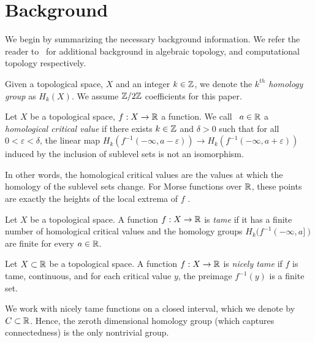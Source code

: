 \section{Background}\label{sec:background}

We begin by summarizing the necessary background information. We refer the reader
to~\cite{HatcherAlgebraic02, EdelsbrunnerComputational10} for additional background in algebraic
topology,  and computational topology respectively.

Given a topological space, $X$ and an integer $k \in \mbox{$\mathbb Z$}$, we denote the
\emph{$k^{th}$ homology group} as $H_k(X)$. We assume $\mbox{$\mathbb Z$}/2\mbox{$\mathbb Z$}$
coefficients for this paper.

\begin{defn}
    Let $X$ be a topological space, $f:X \rightarrow \mathbb{R}$ a function. We
    call~ $a\in \mathbb{R}$ a \emph{homological critical value} if there exists $k \in \mbox{$\mathbb Z$}$ and
    $\delta > 0$ such that for all $0 < \varepsilon < \delta$, the linear map
    $H_k(f^{-1}(-\infty, a-\varepsilon)) \rightarrow H_k(f^{-1}(-\infty,
    a+\varepsilon))$ induced by the inclusion of sublevel sets is not an isomorphism.
\end{defn}

In other words, the homological critical values are the values at which the
homology of the sublevel sets change. For Morse functions over $\mathbb{R}$, these points are exactly the heights of the local extrema of $f$ \cite{MilnorMorse63}.

\begin{defn}[Tameness]
    Let $X$ be a topological space. A function $f: X \rightarrow
    \mathbb{R}$ is \emph{tame} if it has a finite number of homological critical values
    and the homology groups $H_k(f^{-1}(-\infty, a])$ are finite for every $a
    \in \mathbb{R}$.
\end{defn}

\begin{defn}
    Let $X \subset \mathbb{R}$ be a topological space. A function $f: X \rightarrow \mathbb{R}$
    is \emph{nicely tame} if $f$ is tame, continuous, and for each critical
    value $y$, the preimage $f^{-1}(y)$ is a finite set.
\end{defn}

We work with nicely tame functions on a closed interval, which we denote by
\mbox{$C\subset \mathbb{R}$}.  Hence, the zeroth dimensional homology group (which captures
connectedness) is the only nontrivial group.

